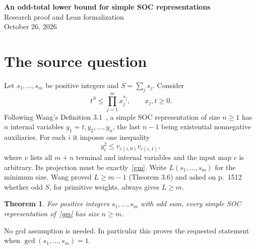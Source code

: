 \documentclass[11pt]{article}
\newtheorem{theorem}{Theorem}
\begin{document}
\begin{center}
{\Large\bfseries An odd-total lower bound for simple SOC representations}\\[.5em]
Research proof and Lean formalization\\
October 26, 2026
\end{center}
\begin{abstract}
We answer the second open question in Section 7 of Wang's 2024 paper on
weighted geometric means: if the positive primitive integer weights have
odd sum, every simple second-order cone representation has at least as many
constraints as original input variables. The proof treats the literal
existential representation, allowing repeated indices, self-loops, unused
variables, and cycles initially. Equality in the previous counting bound
forces an injective input map. Logarithmic balance equations and a finite
doubling argument then force the total weight to be even. The full
representation theorem is formally verified in Lean.
\end{abstract}

\section{The source question}
Let $s_1,\ldots,s_m$ be positive integers and $S=\sum_j s_j$. Consider
\begin{equation}\label{gm}
 t^S\le\prod_{j=1}^m x_j^{s_j},\qquad x_j,t\ge0.
\end{equation}
Following Wang's Definition 3.1~\cite{Wang}, a simple SOC representation of
size $n\ge1$ has $n$ internal variables $y_1=t,y_2,\ldots,y_n$, the last
$n-1$ being existential nonnegative auxiliaries. For each $i$ it imposes
one inequality
\begin{equation}\label{constraints}
 y_i^2\le v_{c(i,0)}v_{c(i,1)},
\end{equation}
where $v$ lists all $m+n$ terminal and internal variables and the input map
$c$ is arbitrary. Its projection must be exactly~\eqref{gm}. Write
$L(s_1,\ldots,s_m)$ for the minimum size. Wang proved $L\ge m-1$
(Theorem 3.6) and asked on p.~1512 whether odd $S$, for primitive weights,
always gives $L\ge m$.

\begin{theorem}\label{main}
For positive integers $s_1,\ldots,s_m$ with odd sum, every simple SOC
representation of~\eqref{gm} has size $n\ge m$.
\end{theorem}
No gcd assumption is needed. In particular this proves the requested
statement when $\gcd(s_1,\ldots,s_m)=1$.
\end{document}
